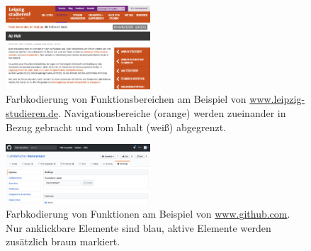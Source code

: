 \documentclass[11pt, bibliography=totoc]{scrartcl}
\begin{document}
\begin{figure}[h]
	\centering
	\includegraphics[width=0.48\textwidth]{img/functional_areas.png}
	\caption{Farbkodierung von Funktionsbereichen am Beispiel von \url{www.leipzig-studieren.de}. Navigationsbereiche (orange) werden zueinander in Bezug gebracht und vom Inhalt (weiß) abgegrenzt.}
	\label{fig:functional_areas}
\end{figure}

\begin{figure}[h]
	\centering
	\includegraphics[width=0.48\textwidth]{img/functions.png}
	\caption{Farbkodierung von Funktionen am Beispiel von \url{www.github.com}. Nur anklickbare Elemente sind blau, aktive Elemente werden zusätzlich braun markiert.}
	\label{fig:functions}
\end{figure}
\end{document}

